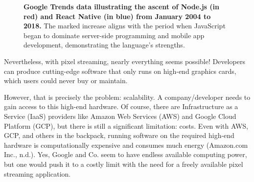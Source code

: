 \documentclass[10pt]{article}
\begin{document}
\begin{sloppypar}
  \begin{figure}[ht]
    \centering
    \caption[Google Trends data illustrating the ascent of Node.js and React Native.]{\textbf{Google Trends data illustrating the ascent of Node.js (in red) and React Native (in blue) from January 2004 to 2018.} The marked increase aligns with the period when JavaScript began to dominate server-side programming and mobile app development, demonstrating the language’s strengths.}
    \label{fig:pixel-streaming-architecture}
  \end{figure}

  Nevertheless, with pixel streaming, nearly everything seems possible! Developers can produce cutting-edge software that only runs on high-end graphics cards, which users could never buy or maintain.

  However, that is precisely the problem: scalability. A company/developer needs to gain access to this high-end hardware. Of course, there are Infrastructure as a Service (IaaS) providers like Amazon Web Services (AWS) and Google Cloud Platform (GCP), but there is still a significant limitation: costs. Even with AWS, GCP, and others in the backpack, running software on the required high-end hardware is computationally expensive and consumes much energy (Amazon.com Inc., n.d.). Yes, Google and Co. seem to have endless available computing power, but one would push it to a costly limit with the need for a freely available pixel streaming application.


\end{sloppypar}
\end{document}
